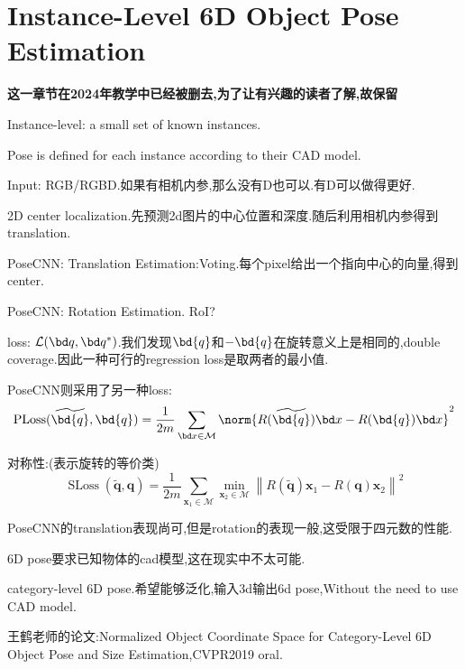 \section{Instance-Level 6D Object Pose Estimation}

\textbf{这一章节在2024年教学中已经被删去,为了让有兴趣的读者了解,故保留}

Instance-level: a small set of known instances.

Pose is defined for each instance according to their CAD model.

Input: RGB/RGBD.如果有相机内参,那么没有D也可以.有D可以做得更好.

2D center localization.先预测2d图片的中心位置和深度.随后利用相机内参得到translation.

PoseCNN: Translation Estimation:Voting.每个pixel给出一个指向中心的向量,得到center.

PoseCNN: Rotation Estimation. RoI?

loss: $\mathcal{L}(\bd q, \bd q^{*})$.我们发现$\bd{q}$和$-\bd{q}$在旋转意义上是相同的,double coverage.因此一种可行的regression loss是取两者的最小值.

PoseCNN则采用了另一种loss:
\begin{equation}
   \mathrm{PLoss}(\widetilde{\bd{q}}, \bd{q}) = \frac{1}{2m}\sum_{\bd x \in \mathcal{M}} \norm{R(\widetilde{\bd{q}}) \bd x - R(\bd{q}) \bd x}^2
\end{equation}

对称性:(表示旋转的等价类)
\begin{equation}
   \operatorname{SLoss}(\widetilde{\mathbf{q}}, \mathbf{q})=\frac{1}{2 m} \sum_{\mathbf{x}_{1} \in \mathcal{M}} \min _{\mathbf{x}_{2} \in \mathcal{M}}\left\|R(\tilde{\mathbf{q}}) \mathbf{x}_{1}-R(\mathbf{q}) \mathbf{x}_{2}\right\|^{2}
\end{equation}

PoseCNN的translation表现尚可,但是rotation的表现一般,这受限于四元数的性能.

6D pose要求已知物体的cad模型,这在现实中不太可能.

category-level 6D pose.希望能够泛化,输入3d输出6d pose,Without the need to use CAD model.

王鹤老师的论文:Normalized Object Coordinate Space for Category-Level 6D Object Pose and Size Estimation,CVPR2019 oral.

